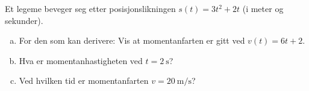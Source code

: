 %
Et legeme beveger seg etter posisjonslikningen $s(t) = 3t^2 + 2t$ (i meter og sekunder).
\begin{enumerate}[a)]
    \item For den som kan derivere: Vis at momentanfarten er gitt ved $v(t) = 6t + 2$.
    \item Hva er momentanhastigheten ved $t = \SI{2}{\second}$?
    \item Ved hvilken tid er momentanfarten $v = \SI{20}{\metre\per\second}$?
\end{enumerate}
